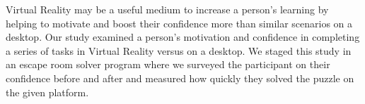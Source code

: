 \documentclass[manuscript,screen,review]{acmart}
\begin{document}
Virtual Reality may be a useful medium to increase a person’s learning by helping to motivate and boost their confidence more than similar scenarios on a desktop. Our study examined a person’s motivation and confidence in completing a series of tasks in Virtual Reality versus on a desktop. We staged this study in an escape room solver program where we surveyed the participant on their confidence before and after and measured how quickly they solved the puzzle on the given platform.




\end{document}
